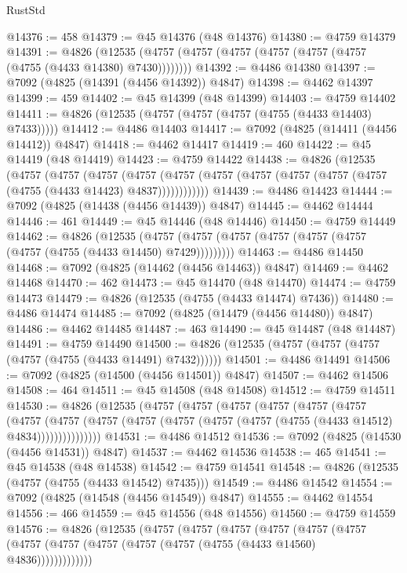 \begin{lexlean}{RustStd}
\begin{coremodule}
@14376 := 458
@14379 := @45 @14376 (@48 @14376)
@14380 := @4759 @14379
@14391 := @4826
    (@12535 (@4757 (@4757 (@4757 (@4757 (@4757 (@4757 (@4755 (@4433 @14380) @7430))))))))
@14392 := @4486 @14380
@14397 := @7092 (@4825 (@14391 (@4456 @14392)) @4847)
@14398 := @4462 @14397
@14399 := 459
@14402 := @45 @14399 (@48 @14399)
@14403 := @4759 @14402
@14411 := @4826 (@12535 (@4757 (@4757 (@4757 (@4755 (@4433 @14403) @7433)))))
@14412 := @4486 @14403
@14417 := @7092 (@4825 (@14411 (@4456 @14412)) @4847)
@14418 := @4462 @14417
@14419 := 460
@14422 := @45 @14419 (@48 @14419)
@14423 := @4759 @14422
@14438 := @4826
    (@12535
      (@4757
        (@4757
          (@4757
            (@4757 (@4757 (@4757 (@4757 (@4757 (@4757 (@4757 (@4755 (@4433 @14423) @4837))))))))))))
@14439 := @4486 @14423
@14444 := @7092 (@4825 (@14438 (@4456 @14439)) @4847)
@14445 := @4462 @14444
@14446 := 461
@14449 := @45 @14446 (@48 @14446)
@14450 := @4759 @14449
@14462 := @4826
    (@12535 (@4757 (@4757 (@4757 (@4757 (@4757 (@4757 (@4757 (@4755 (@4433 @14450) @7429)))))))))
@14463 := @4486 @14450
@14468 := @7092 (@4825 (@14462 (@4456 @14463)) @4847)
@14469 := @4462 @14468
@14470 := 462
@14473 := @45 @14470 (@48 @14470)
@14474 := @4759 @14473
@14479 := @4826 (@12535 (@4755 (@4433 @14474) @7436))
@14480 := @4486 @14474
@14485 := @7092 (@4825 (@14479 (@4456 @14480)) @4847)
@14486 := @4462 @14485
@14487 := 463
@14490 := @45 @14487 (@48 @14487)
@14491 := @4759 @14490
@14500 := @4826 (@12535 (@4757 (@4757 (@4757 (@4757 (@4755 (@4433 @14491) @7432))))))
@14501 := @4486 @14491
@14506 := @7092 (@4825 (@14500 (@4456 @14501)) @4847)
@14507 := @4462 @14506
@14508 := 464
@14511 := @45 @14508 (@48 @14508)
@14512 := @4759 @14511
@14530 := @4826
    (@12535
      (@4757
        (@4757
          (@4757
            (@4757
              (@4757
                (@4757
                  (@4757
                    (@4757
                      (@4757 (@4757 (@4757 (@4757 (@4757 (@4755 (@4433 @14512) @4834)))))))))))))))
@14531 := @4486 @14512
@14536 := @7092 (@4825 (@14530 (@4456 @14531)) @4847)
@14537 := @4462 @14536
@14538 := 465
@14541 := @45 @14538 (@48 @14538)
@14542 := @4759 @14541
@14548 := @4826 (@12535 (@4757 (@4755 (@4433 @14542) @7435)))
@14549 := @4486 @14542
@14554 := @7092 (@4825 (@14548 (@4456 @14549)) @4847)
@14555 := @4462 @14554
@14556 := 466
@14559 := @45 @14556 (@48 @14556)
@14560 := @4759 @14559
@14576 := @4826
    (@12535
      (@4757
        (@4757
          (@4757
            (@4757
              (@4757
                (@4757 (@4757 (@4757 (@4757 (@4757 (@4757 (@4755 (@4433 @14560) @4836)))))))))))))

\end{coremodule}
\end{lexlean}

